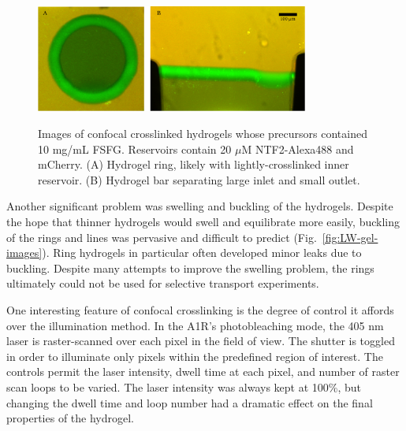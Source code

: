 \begin{figure} %
\caption[NTF2 binding to confocal-crosslinked FSFG hydrogels.]{Images of confocal crosslinked hydrogels whose precursors contained 10 mg/mL FSFG. Reservoirs contain 20 $\mu$M NTF2-Alexa488 and mCherry. (A) Hydrogel ring, likely with lightly-crosslinked inner reservoir. (B) Hydrogel bar separating large inlet and small outlet.}
\centering
\includegraphics[width=0.8\textwidth]{figs/ch03/example-LW-gels-NTF2}
\label{fig:LW-NTF2-images}
\end{figure} %


Another significant problem was swelling and buckling of the hydrogels.  Despite the hope that thinner hydrogels would swell and equilibrate more easily, buckling of the rings and lines was pervasive and difficult to predict (Fig.~\ref{fig:LW-gel-images}).  Ring hydrogels in particular often developed minor leaks due to buckling.  Despite many attempts to improve the swelling problem, the rings ultimately could not be used for selective transport experiments.

One interesting feature of confocal crosslinking is the degree of control it affords over the illumination method.  In the A1R's photobleaching mode, the 405 nm laser is raster-scanned over each pixel in the field of view.  The shutter is toggled in order to illuminate only pixels within the predefined region of interest.  The controls permit the laser intensity, dwell time at each pixel, and number of raster scan loops to be varied.  The laser intensity was always kept at 100\%, but changing the dwell time and loop number had a dramatic effect on the final properties of the hydrogel.

